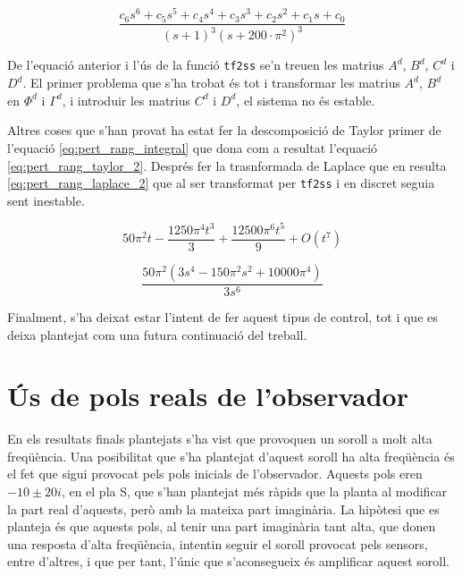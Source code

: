 \documentclass[12pt,a4paper,final,twoside,openright]{report}
\begin{document}
\begin{equation}\label{eq:pert_rang_agrup}
\frac{c_6 s^6 + c_5 s^5 + c_4 s^4 + c_3 s^3 + c_2 s^2 + c_1 s + c_0}{(s+1)^3 (s+200\cdot \pi^2)^3}
\end{equation}

De l'equació anterior i l'ús de la funció \texttt{tf2ss} se'n treuen les matrius $A^d$, $B^d$, $C^d$ i $D^d$. El primer problema que s'ha trobat és tot i transformar les matrius $A^d$, $B^d$ en $\Phi^d$ i $\Gamma^d$, i introduir les matrius $C^d$ i $D^d$, el sistema no és estable.

Altres coses que s'han provat ha estat fer la descomposició de Taylor primer de l'equació \eqref{eq:pert_rang_integral} que dona com a resultat l'equació \eqref{eq:pert_rang_taylor_2}. Després fer la trasnformada de Laplace que en resulta \eqref{eq:pert_rang_laplace_2} que al ser transformat per \texttt{tf2ss} i en discret seguia sent inestable.

\begin{equation}\label{eq:pert_rang_taylor_2}
50\pi^2 t - \frac{1250 \pi^4 t^3}{3} + \frac{12500 \pi^6 t^5}{9} + O(t^7)
\end{equation}

\begin{equation}\label{eq:pert_rang_laplace_2}
\frac{50\pi^2 \left( 3 s^4 - 150 \pi^2 s^2 + 10000 \pi^4 \right)}{3s^6}
\end{equation}

Finalment, s'ha deixat estar l'intent de fer aquest tipus de control, tot i que es deixa plantejat com una futura continuació del treball. 

\section{Ús de pols reals de l'observador}

En els resultats finals plantejats s'ha vist que provoquen un soroll a molt alta freqüència. Una posibilitat que s'ha plantejat d'aquest soroll ha alta freqüència és el fet que sigui provocat pels pols inicials de l'observador. Aquests pols eren $-10\pm20i$, en el pla S, que s'han plantejat més ràpids que la planta al modificar la part real d'aquests, però amb la mateixa part imaginària. La hipòtesi que es planteja és que aquests pols, al tenir una part imaginària tant alta, que donen una resposta d'alta freqüència,  intentin seguir el soroll provocat pels sensors, entre d'altres, i que per tant, l'únic que s'aconsegueix és amplificar aquest soroll.
\end{document}
